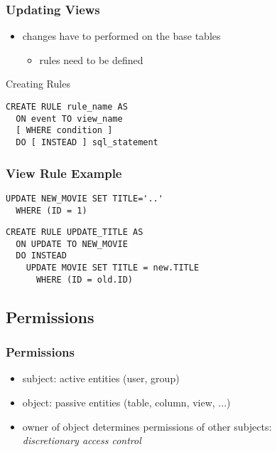 \documentclass[dvipsnames]{beamer}
\theoremstyle{plain}
\begin{document}
\begin{frame}[fragile]
  \frametitle{Updating Views}

  \begin{itemize}
    \item changes have to performed on the base tables
    \begin{itemize}
      \item rules need to be defined
    \end{itemize}
  \end{itemize}

  \pause
  \begin{block}{Creating Rules}
    \begin{lstlisting}
CREATE RULE rule_name AS
  ON event TO view_name
  [ WHERE condition ]
  DO [ INSTEAD ] sql_statement
    \end{lstlisting}
  \end{block}
\end{frame}

\begin{frame}[fragile]
  \frametitle{View Rule Example}

  \begin{example}
    \begin{lstlisting}
UPDATE NEW_MOVIE SET TITLE='..'
  WHERE (ID = 1)
    \end{lstlisting}

    \pause
    \begin{lstlisting}
CREATE RULE UPDATE_TITLE AS
  ON UPDATE TO NEW_MOVIE
  DO INSTEAD
    UPDATE MOVIE SET TITLE = new.TITLE
      WHERE (ID = old.ID)
    \end{lstlisting}
  \end{example}
\end{frame}

\subsection{Permissions}

\begin{frame}
  \frametitle{Permissions}

  \begin{itemize}
    \item \alert{subject}: active entities (user, group)
    \item \alert{object}: passive entities (table, column, view, ...)

    \pause
    \item owner of object determines permissions of other subjects:\\
      \emph{discretionary access control}
  \end{itemize}
\end{frame}
\end{document}
